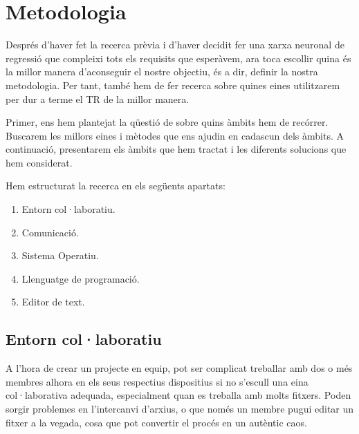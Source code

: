 \chapter{Metodologia}
\label{c:Metodologia}

Després d'haver fet la recerca prèvia i d'haver decidit fer una xarxa neuronal de regressió que compleixi tots els requisits que esperàvem, ara toca escollir quina és la millor manera d'aconseguir el nostre objectiu, és a dir, definir la nostra metodologia. Per tant, també hem de fer recerca sobre quines eines utilitzarem per dur a terme el TR de la millor manera.

Primer, ens hem plantejat la qüestió de sobre quins àmbits hem de recórrer. Buscarem les millors eines i mètodes que ens ajudin en cadascun dels àmbits. A continuació, presentarem els àmbits que hem tractat i les diferents solucions que hem considerat.

Hem estructurat la recerca en els següents apartats:
\begin{enumerate}
 \item Entorn col·laboratiu.
 \item Comunicació.
 \item Sistema Operatiu.
 \item Llenguatge de programació.
 \item Editor de text.
\end{enumerate}
%


\section{Entorn col·laboratiu}\label{sec:4.3}
A l’hora de crear un projecte en equip, pot ser complicat treballar amb dos o més membres alhora en els seus respectius dispositius si no s’escull una eina col·laborativa adequada, especialment quan es treballa amb molts fitxers. Poden sorgir problemes en l’intercanvi d’arxius, o que només un membre pugui editar un fitxer a la vegada, cosa que pot convertir el procés en un autèntic caos.


